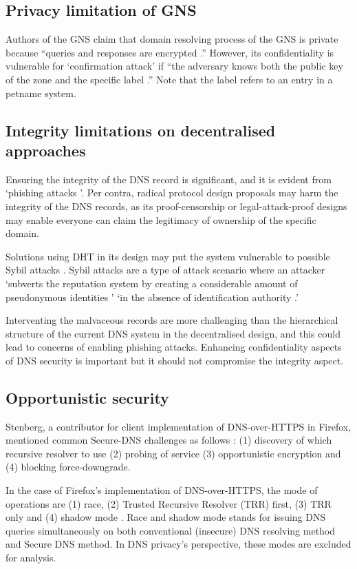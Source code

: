 \subsection{Privacy limitation of GNS}
Authors of the GNS claim that domain resolving process of the GNS is private because ``queries and responses are encrypted \cite{grothoff2017nsa, wachs2014censorship}.''
However, its confidentiality is vulnerable for `confirmation attack' if ``the adversary knows both the public key of the zone and the specific label \cite{wachs2014censorship}.'' Note that the label refers to an entry in a petname system. 

\subsection{Integrity limitations on decentralised approaches}
Ensuring the integrity of the DNS record is significant, and it is evident from `phishing attacks \cite{ariyapperuma2007security, ollmann2004phishing}'.
Per contra, radical protocol design proposals may harm the integrity of the DNS records, as its proof-censorship or legal-attack-proof designs may enable everyone can claim the legitimacy of ownership of the specific domain.

Solutions using DHT in its design may put the system vulnerable to possible Sybil attacks \cite{6503215, SitE2002Scfp}.
Sybil attacks are a type of attack scenario where an attacker `subverts the reputation system by creating a considerable amount of pseudonymous identities \cite{TRIFA20141135}' `in the absence of identification authority \cite{douceur2002sybil}.'

Interventing the malvaceous records are more challenging than the hierarchical structure of the current DNS system in the decentralised design, and this could lead to concerns of enabling phishing attacks.
Enhancing confidentiality aspects of DNS security is important but it should not compromise the integrity aspect.

\subsection{Opportunistic security}
Stenberg, a contributor for client implementation of DNS-over-HTTPS in Firefox, mentioned common Secure-DNS challenges as follows \cite{daniel-doh}: (1) discovery of which recursive resolver to use (2) probing of service (3) opportunistic encryption and (4) blocking force-downgrade.

In the case of Firefox's implementation of DNS-over-HTTPS, the mode of operations are (1) race, (2) Trusted Recursive Resolver (TRR) first, (3) TRR only and (4) shadow mode \cite{firefox-doh-engine}.
Race and shadow mode stands for issuing DNS queries simultaneously on both conventional (insecure) DNS resolving method and Secure DNS method.
In DNS privacy's perspective, these modes are excluded for analysis.

